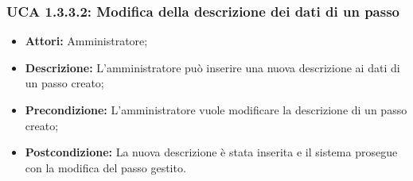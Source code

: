 \subsubsection{UCA 1.3.3.2: Modifica della descrizione dei dati di un passo}
\begin{itemize}
\item \textbf{Attori:}
 Amministratore;
\item \textbf{Descrizione:}
 L'amministratore può inserire una nuova descrizione ai dati di un passo creato;
\item \textbf{Precondizione:} 
L'amministratore vuole modificare la descrizione di un passo creato;
\item \textbf{Postcondizione:}
 La nuova descrizione è stata inserita e il sistema prosegue con la modifica del passo gestito.
\end{itemize}

\hypertarget{A1.3.3.3}{}
